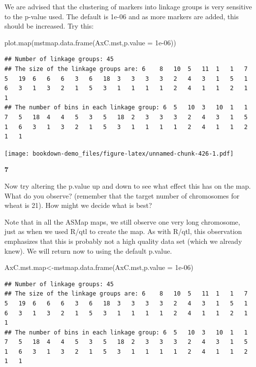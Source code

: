 \documentclass[
]{book}
\makeatletter
\newenvironment{Shaded}{\begin{snugshade}}{\end{snugshade}}
\newcommand{\AttributeTok}[1]{\textcolor[rgb]{0.77,0.63,0.00}{#1}}
\newcommand{\FloatTok}[1]{\textcolor[rgb]{0.00,0.00,0.81}{#1}}
\newcommand{\FunctionTok}[1]{\textcolor[rgb]{0.00,0.00,0.00}{#1}}
\newcommand{\NormalTok}[1]{#1}
\newcommand{\OtherTok}[1]{\textcolor[rgb]{0.56,0.35,0.01}{#1}}
\newenvironment{kframe}{%
\medskip{}
\setlength{\fboxsep}{.8em}
 \def\at@end@of@kframe{}%
 \ifinner\ifhmode%
  \def\at@end@of@kframe{\end{minipage}}%
  \begin{minipage}{\columnwidth}%
 \fi\fi%
 \def\FrameCommand##1{\hskip\@totalleftmargin \hskip-\fboxsep
 \colorbox{shadecolor}{##1}\hskip-\fboxsep
     \hskip-\linewidth \hskip-\@totalleftmargin \hskip\columnwidth}%
 \MakeFramed {\advance\hsize-\width
   \@totalleftmargin\z@ \linewidth\hsize
   \@setminipage}}%
 {\par\unskip\endMakeFramed%
 \at@end@of@kframe}
\newenvironment{rmdblock}[1]
  {
  \begin{itemize}
  \renewcommand{\labelitemi}{
    \raisebox{-.7\height}[0pt][0pt]{
      {\setkeys{Gin}{width=3em,keepaspectratio}\texttt{[image: images/\#1]}}
    }
  }
  \setlength{\fboxsep}{1em}
  \begin{kframe}
  \item
  }
  {
  \end{kframe}
  \end{itemize}
  }
\newenvironment{rmdquiz}
  {\begin{rmdblock}{quiz}}
  {\end{rmdblock}}
\makeatother
\begin{document}
We are advised that the clustering of markers into linkage groups is very sensitive to the p-value used. The default is 1e-06 and as more markers are added, this should be increased. Try this:

\begin{Shaded}
\begin{Highlighting}[]
\FunctionTok{plot.map}\NormalTok{(}\FunctionTok{mstmap.data.frame}\NormalTok{(AxC.mst,}\AttributeTok{p.value =} \FloatTok{1e{-}06}\NormalTok{)) }
\end{Highlighting}
\end{Shaded}

\begin{verbatim}
## Number of linkage groups: 45
## The size of the linkage groups are: 6    8   10  5   11  1   1   7   5   19  6   6   6   3   6   18  3   3   3   3   2   4   3   1   5   1   6   3   1   3   2   1   5   3   1   1   1   1   2   4   1   1   2   1   1   
## The number of bins in each linkage group: 6  5   10  3   10  1   1   7   5   18  4   4   5   3   5   18  2   3   3   3   2   4   3   1   5   1   6   3   1   3   2   1   5   3   1   1   1   1   2   4   1   1   2   1   1   
\end{verbatim}

\texttt{[image: bookdown-demo\_files/figure-latex/unnamed-chunk-426-1.pdf]}

\begin{rmdquiz}
\textbf{7}

Now try altering the p.value up and down to see what effect this has on the map. What do you observe? (remember that the target number of chromosomes for wheat is 21). How might we decide what is best?
\end{rmdquiz}

Note that in all the ASMap maps, we still observe one very long chromosome, just as when we used R/qtl to create the map. As with R/qtl, this observation emphasizes that this is probably not a high quality data set (which we already knew). We will return now to using the default p.value.

\begin{Shaded}
\begin{Highlighting}[]
\NormalTok{AxC.mst.map}\OtherTok{\textless{}{-}}\FunctionTok{mstmap.data.frame}\NormalTok{(AxC.mst,}\AttributeTok{p.value =} \FloatTok{1e{-}06}\NormalTok{) }
\end{Highlighting}
\end{Shaded}

\begin{verbatim}
## Number of linkage groups: 45
## The size of the linkage groups are: 6    8   10  5   11  1   1   7   5   19  6   6   6   3   6   18  3   3   3   3   2   4   3   1   5   1   6   3   1   3   2   1   5   3   1   1   1   1   2   4   1   1   2   1   1   
## The number of bins in each linkage group: 6  5   10  3   10  1   1   7   5   18  4   4   5   3   5   18  2   3   3   3   2   4   3   1   5   1   6   3   1   3   2   1   5   3   1   1   1   1   2   4   1   1   2   1   1   
\end{verbatim}
\end{document}
